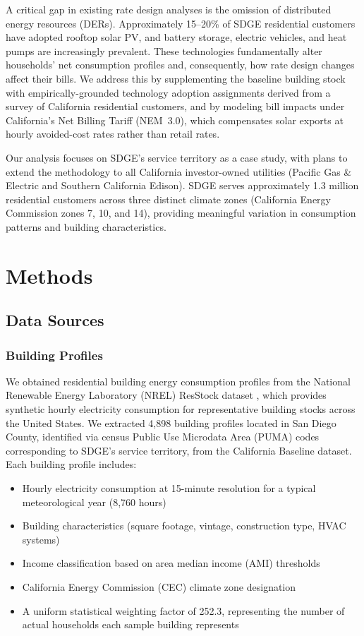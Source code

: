 \documentclass[12pt]{article}
\begin{document}
A critical gap in existing rate design analyses is the omission of distributed energy resources (DERs). Approximately 15--20\% of SDGE residential customers have adopted rooftop solar PV, and battery storage, electric vehicles, and heat pumps are increasingly prevalent. These technologies fundamentally alter households' net consumption profiles and, consequently, how rate design changes affect their bills. We address this by supplementing the baseline building stock with empirically-grounded technology adoption assignments derived from a survey of California residential customers, and by modeling bill impacts under California's Net Billing Tariff (NEM~3.0), which compensates solar exports at hourly avoided-cost rates rather than retail rates.

Our analysis focuses on SDGE's service territory as a case study, with plans to extend the methodology to all California investor-owned utilities (Pacific Gas \& Electric and Southern California Edison). SDGE serves approximately 1.3 million residential customers across three distinct climate zones (California Energy Commission zones 7, 10, and 14), providing meaningful variation in consumption patterns and building characteristics.

\section{Methods}

\subsection{Data Sources}

\subsubsection{Building Profiles}
We obtained residential building energy consumption profiles from the National Renewable Energy Laboratory (NREL) ResStock dataset \citep{[ResStock citation]}, which provides synthetic hourly electricity consumption for representative building stocks across the United States. We extracted 4,898 building profiles located in San Diego County, identified via census Public Use Microdata Area (PUMA) codes corresponding to SDGE's service territory, from the California Baseline dataset. Each building profile includes:
\begin{itemize}
    \item Hourly electricity consumption at 15-minute resolution for a typical meteorological year (8,760 hours)
    \item Building characteristics (square footage, vintage, construction type, HVAC systems)
    \item Income classification based on area median income (AMI) thresholds
    \item California Energy Commission (CEC) climate zone designation
    \item A uniform statistical weighting factor of 252.3, representing the number of actual households each sample building represents
\end{itemize}
\end{document}
